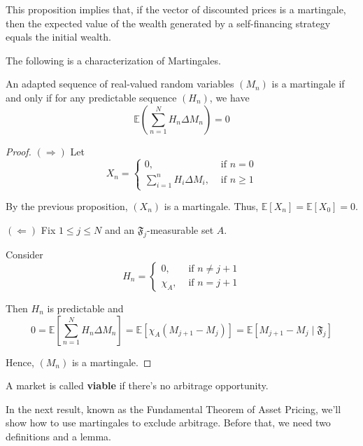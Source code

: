 This proposition implies that, if the vector of discounted prices is a martingale, then the expected value of the wealth generated by a self-financing strategy equals the initial wealth.

The following is a characterization of Martingales.

\begin{proposition}\label{prop:1.2.4}
    An adapted sequence of real-valued random variables $(M_n)$ is a martingale if and only if for any predictable sequence $(H_n)$, we have 
    \[
        \mathbb{E} \left(\sum_{n=1}^{N} H_n \Delta M_n \right) = 0
    \]
\end{proposition}

\begin{proof}
    $(\Rightarrow)$ Let 
    \begin{equation*}
        X_n =
        \begin{cases}
            0, & \text{ if } n = 0 \\
            \sum_{i=1}^{n} H_i \Delta M_i, & \text{ if } n \geq 1
        \end{cases}
    \end{equation*} 

    By the previous proposition, $(X_n)$ is a martingale. Thus, $\mathbb{E}[X_n] = \mathbb{E}[X_0] = 0$.

    $(\Leftarrow)$ Fix $1 \leq j \leq N$ and an $\mathfrak{F}_j$-measurable set $A$.
    
    Consider 
    \begin{equation*}
        H_n =
        \begin{cases}
            0, & \text{ if } n \neq j+1 \\
            \chi_A, & \text{ if } n = j+1
        \end{cases}
    \end{equation*} 

    Then $H_n$ is predictable and 
    \[
        0 = \mathbb{E} \left[ \sum_{n=1}^{N} H_n \Delta M_n \right] = \mathbb{E}[\chi_A(M_{j+1} - M_j)] = \mathbb{E}[M_{j+1} - M_j \mid \mathfrak{F}_j]
    \]

    Hence, $(M_n)$ is a martingale.
\end{proof}

\begin{definition}
    A market is called \textbf{viable} if there's no arbitrage opportunity.
\end{definition}

In the next result, known as the Fundamental Theorem of Asset Pricing, we'll show how to use martingales to exclude arbitrage. Before that, we need two definitions and a lemma.

